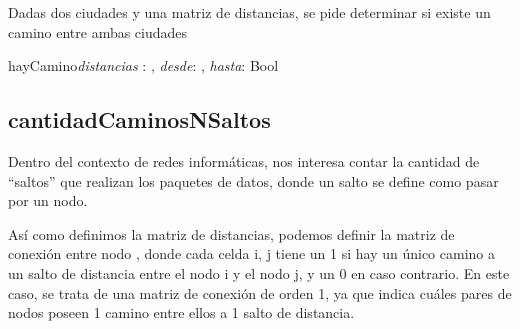 \documentclass[10pt,a4paper]{article}
\begin{document}
 Dadas dos ciudades y una matriz de distancias, se pide determinar si existe un camino entre ambas ciudades
 
 \vspace{2mm}

 
\begin{proc}{hayCamino}{\In \textit{distancias} : \TLista{\TLista{\ent}}, \In \textit{desde}: \ent, \In \textit{hasta}: \ent}{Bool}
\end{proc}





\vspace{4mm}


\subsection{cantidadCaminosNSaltos}

 Dentro del contexto de redes informáticas, nos interesa contar la cantidad de “saltos” que realizan los paquetes de datos, donde un salto se define como pasar por un nodo.

Así como definimos la matriz de distancias, podemos definir la matriz de conexión entre nodo , donde cada celda i, j tiene un 1 si hay un único camino a un salto de distancia entre el nodo i y el nodo j, y un 0 en caso contrario. En este caso, se trata de una matriz de conexión de orden 1, ya que indica cuáles pares de nodos poseen 1 camino entre ellos a 1 salto de distancia.
\end{document}
